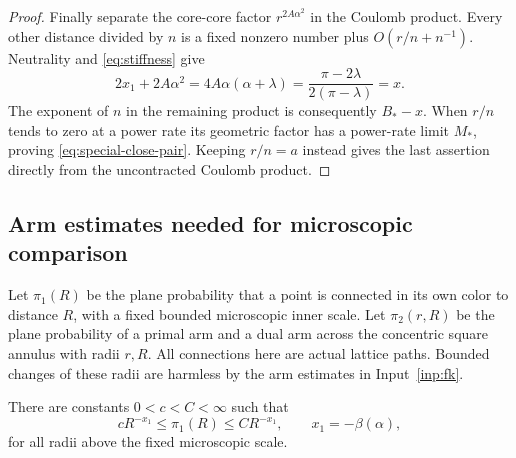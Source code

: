 \begin{proof}
Finally separate the core-core factor $r^{2A\alpha^2}$ in the
Coulomb product.  Every other distance divided by $n$ is a fixed
nonzero number plus $O(r/n+n^{-1})$.  Neutrality and
\eqref{eq:stiffness} give
\[
 2x_1+2A\alpha^2
 =4A\alpha(\alpha+\lambda)
 =\frac{\pi-2\lambda}{2(\pi-\lambda)}=x.
\]
The exponent of $n$ in the remaining product is consequently
$B_*-x$.  When $r/n$ tends to zero at a power rate its geometric
factor has a power-rate limit $M_*$, proving
\eqref{eq:special-close-pair}.  Keeping $r/n=a$ instead gives the
last assertion directly from the uncontracted Coulomb product.
\end{proof}

\subsection{Arm estimates needed for microscopic comparison}

Let $\pi_1(R)$ be the plane probability that a point is connected in
its own color to distance $R$, with a fixed bounded microscopic inner
scale.  Let $\pi_2(r,R)$ be the plane probability of a primal arm and
a dual arm across the concentric square annulus with radii $r,R$.
All connections here are actual lattice paths.  Bounded changes of
these radii are harmless by the arm estimates in Input~\ref{inp:fk}.

\begin{lemma}\label{lem:one-arm}
There are constants $0<c<C<\infty$ such that
\begin{equation}\label{eq:one-arm}
 cR^{-x_1}\le\pi_1(R)\le CR^{-x_1},
 \qquad x_1=-\beta(\alpha),
\end{equation}
for all radii above the fixed microscopic scale.
\end{lemma}

